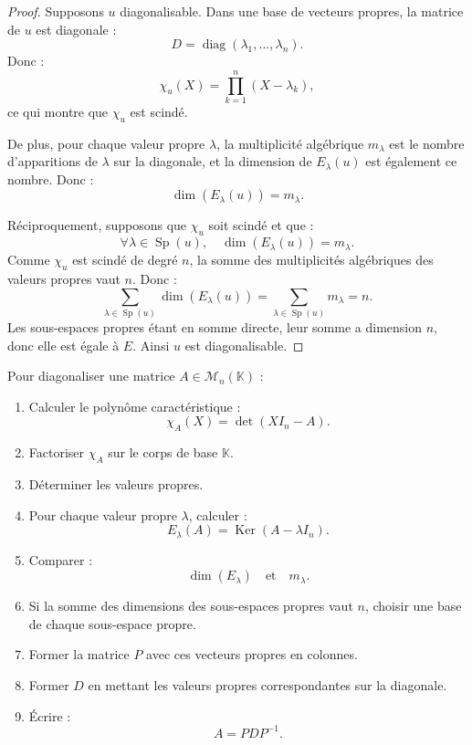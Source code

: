 \documentclass[11pt,a4paper]{article}
\newcommand{\K}{\mathbb K}
\newcommand{\M}{\mathcal M}
\newcommand{\Ker}{\operatorname{Ker}}
\newcommand{\Sp}{\operatorname{Sp}}
\newcommand{\diag}{\operatorname{diag}}
\begin{document}
\begin{proof}
Supposons \(u\) diagonalisable.  
Dans une base de vecteurs propres, la matrice de \(u\) est diagonale :
\[
D=\diag(\lambda_1,\dots,\lambda_n).
\]
Donc :
\[
\chi_u(X)=\prod_{k=1}^n(X-\lambda_k),
\]
ce qui montre que \(\chi_u\) est scindé.

De plus, pour chaque valeur propre \(\lambda\), la multiplicité algébrique \(m_\lambda\) est le nombre d'apparitions de \(\lambda\) sur la diagonale, et la dimension de \(E_\lambda(u)\) est également ce nombre.  
Donc :
\[
\dim(E_\lambda(u))=m_\lambda.
\]

Réciproquement, supposons que \(\chi_u\) soit scindé et que :
\[
\forall\lambda\in\Sp(u),\quad \dim(E_\lambda(u))=m_\lambda.
\]
Comme \(\chi_u\) est scindé de degré \(n\), la somme des multiplicités algébriques des valeurs propres vaut \(n\).  
Donc :
\[
\sum_{\lambda\in\Sp(u)}\dim(E_\lambda(u))
=
\sum_{\lambda\in\Sp(u)}m_\lambda
=
n.
\]
Les sous-espaces propres étant en somme directe, leur somme a dimension \(n\), donc elle est égale à \(E\).  
Ainsi \(u\) est diagonalisable.
\end{proof}

\begin{methodbox}
Pour diagonaliser une matrice \(A\in\M_n(\K)\) :
\begin{enumerate}
    \item Calculer le polynôme caractéristique :
    \[
    \chi_A(X)=\det(XI_n-A).
    \]
    \item Factoriser \(\chi_A\) sur le corps de base \(\K\).
    \item Déterminer les valeurs propres.
    \item Pour chaque valeur propre \(\lambda\), calculer :
    \[
    E_\lambda(A)=\Ker(A-\lambda I_n).
    \]
    \item Comparer :
    \[
    \dim(E_\lambda)
    \quad\text{et}\quad
    m_\lambda.
    \]
    \item Si la somme des dimensions des sous-espaces propres vaut \(n\), choisir une base de chaque sous-espace propre.
    \item Former la matrice \(P\) avec ces vecteurs propres en colonnes.
    \item Former \(D\) en mettant les valeurs propres correspondantes sur la diagonale.
    \item Écrire :
    \[
    A=PDP^{-1}.
    \]
\end{enumerate}
\end{methodbox}
\end{document}
